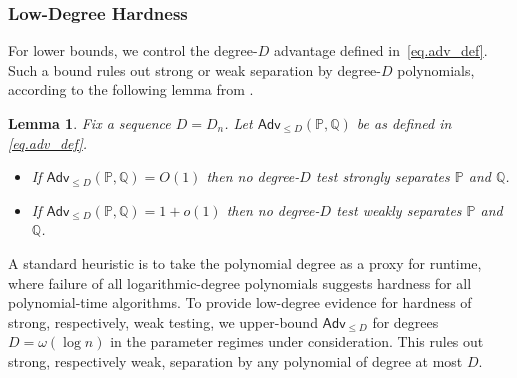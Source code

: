 \documentclass[11pt, letterpaper]{article}
\newtheorem{lemma}[theorem]{Lemma}
\numberwithin{equation}{section}
\newcommand{\Adv}{\mathsf{Adv}}
\newcommand{\PP}{\mathbb{P}}
\newcommand{\QQ}{\mathbb{Q}}
\begin{document}
\subsubsection{Low-Degree Hardness}
For lower bounds, we control the degree-$D$ advantage defined in~\eqref{eq.adv_def}. Such a bound rules out strong or weak separation by degree-$D$ polynomials, according to the following lemma from \cite{bandeira2022franz,coja2022statistical}.
\begin{lemma}\label{lem:separation-weak-strong}
Fix a sequence $D=D_n$. Let $\Adv_{\leq D}(\PP,\QQ)$ be as defined in \eqref{eq.adv_def}.
    \begin{itemize}
        \item If $\Adv_{\leq D}(\PP,\QQ)=O(1)$ then no degree-$D$ test strongly separates $\PP$ and $\QQ$.
        \item If $\Adv_{\leq D}(\PP,\QQ)=1+o(1)$ then no degree-$D$ test weakly separates $\PP$ and $\QQ$.
    \end{itemize}
\end{lemma}
A standard heuristic is to take the polynomial degree as a proxy for runtime, where failure of all logarithmic-degree polynomials suggests hardness for all polynomial-time algorithms. To provide low-degree evidence for hardness of strong, respectively, weak testing, we upper-bound $\Adv_{\le D}$ for degrees $D=\omega(\log n)$ in the
parameter regimes under consideration. This rules out strong, respectively weak,
separation by any polynomial of degree at most $D$. 
\end{document}
